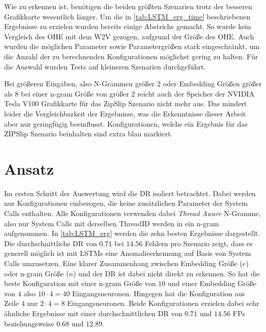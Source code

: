     Wie zu erkennen ist, benötigen die beiden größten Szenarien trotz der besseren Grafikkarte wesentlich länger.
    Um die in \autoref{tab:LSTM_erg_time} beschriebenen Ergebnisse zu erzielen wurden bereits einige Abstriche gemacht.
    So wurde kein Vergleich des \ac{OHE} mit dem \ac{W2V} gezogen, aufgrund der Größe des \ac{OHE}.
    Auch wurden die möglichen Parameter sowie Parametergrößen stark eingeschränkt, um die Anzahl der zu berechnenden Konfigurationen möglichst gering zu halten.
    Für die Auswahl wurden Tests auf kleineren Szenarien durchgeführt.
    
    Bei größeren Eingaben, also N-Grammen größer $2$ oder Embedding Größen größer als $8$ bei einer n-gram Größe von größer $2$ reicht auch der Speicher der NVIDIA Tesla V100 Grafikkarte für das ZipSlip Szenario nicht mehr aus.
    Das mindert leider die Vergleichbarkeit der Ergebnisse, was die Erkenntnisse dieser Arbeit aber nur geringfügig beeinflusst.
    Konfigurationen, welche ein Ergebnis für das ZIPSlip Szenario beinhalten sind extra blau markiert.

    \section{ Ansatz}\label{sec:erg_LSTM}

    Im ersten Schritt der Auswertung wird die \ac{DR} isoliert betrachtet.
    Dabei werden nur Konfigurationen einbezogen, die keine zusätzlichen Parameter der System Calls enthalten.
    Alle Konfigurationen verwenden dabei \textit{Thread Aware} N-Gramme, also nur System Calls mit derselben ThreadID werden in ein n-gram aufgenommen.
    In \autoref{tab:LSTM_erg} werden die zehn besten Ergebnisse dargestellt.
    Die durchschnittliche \ac{DR} von $0.71$ bei $14.56$ Fehlern pro Szenario zeigt, dass es generell möglich ist mit \acp{LSTM} eine Anomalieerkennung auf Basis von System Calls umzusetzen.
    Eine klarer Zusammenhang zwischen Embedding Größe ($e$) oder n-gram Größe ($n$) und der \ac{DR} ist dabei nicht direkt zu erkennen.
    So hat die beste Konfiguration mit einer n-gram Größe von $10$ und einer Embedding Größe von $4$ also $10 \cdot 4=40$ Eingangsneuronen.
    Hingegen hat die Konfiguration aus Zeile $4$ nur $2 \cdot 4 = 8$ Eingangsneuronen.
    Beide Konfigurationen erzielen dabei sehr ähnliche Ergebnisse mit einer durchschnittlichen \ac{DR} von $0.71$ und $14.56$ \acp{FP} beziehungsweise $0.68$ und $12.89$.

